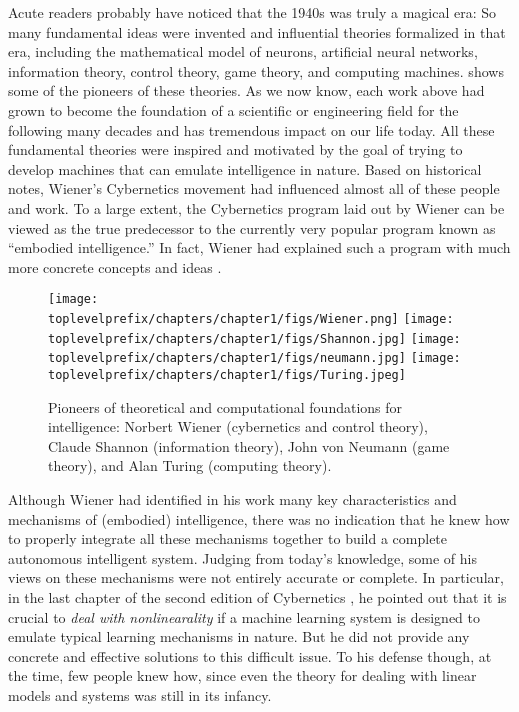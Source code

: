 \documentclass[../../book-main.tex]{subfiles}
\begin{document}
Acute readers probably have noticed that the 1940s was truly a magical era: So many fundamental ideas were invented and influential theories formalized in that era, including the mathematical model of neurons, artificial neural networks, information theory, control theory, game theory, and computing machines.  shows some of the pioneers of these theories. As we now know, each work above had grown to become the foundation of a scientific or engineering field for the following many decades and has tremendous impact on our life today. All these fundamental theories were inspired and motivated by the goal of trying to develop machines that can emulate intelligence in nature. Based on historical notes, Wiener's Cybernetics movement had influenced almost all of these people and work. To a large extent, the Cybernetics program laid out by Wiener can be viewed as the true predecessor to the currently very popular program known as ``embodied intelligence.'' In fact, Wiener had explained such a program with much more concrete concepts and ideas \cite{Wiener-Cybernetics-1961}. 
\begin{figure}
    \centering
    \texttt{[image: \\toplevelprefix/chapters/chapter1/figs/Wiener.png]}
    \texttt{[image: \\toplevelprefix/chapters/chapter1/figs/Shannon.jpg]}
    \texttt{[image: \\toplevelprefix/chapters/chapter1/figs/neumann.jpg]}
    \texttt{[image: \\toplevelprefix/chapters/chapter1/figs/Turing.jpeg]}
    \caption{Pioneers of theoretical and computational foundations for intelligence: Norbert Wiener (cybernetics and control theory), Claude Shannon (information theory), John von Neumann (game theory), and Alan Turing (computing theory).}
    \label{fig:god-fathers}
\end{figure}

Although Wiener had identified in his work many key characteristics and mechanisms of (embodied) intelligence, there was no indication that he knew how to properly integrate all these mechanisms together to build a complete autonomous intelligent system. Judging from today's knowledge, some of his views on these mechanisms were not entirely accurate or complete. In particular, in the last chapter of the second edition of Cybernetics \cite{Wiener-Cybernetics-1961}, he pointed out that it is crucial to {\em deal with nonlinearality} if a machine learning system is designed to emulate typical learning mechanisms in nature. But he did not provide any concrete and effective solutions to this difficult issue. To his defense though, at the time, few people knew how, since even the theory for dealing with linear models and systems was still in its infancy. 
\end{document}

